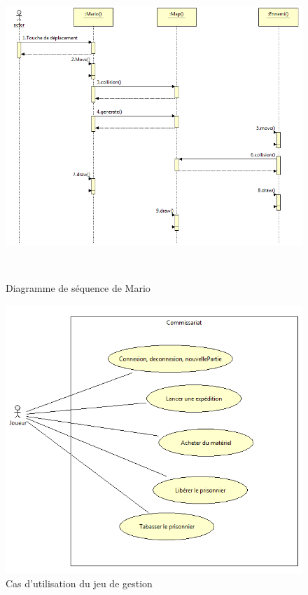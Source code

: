 \begin{figure}[h]
 \centering
 \includegraphics[height=11.5cm]{../umls/UML_images/Mario/Sequence} \hfill
 \caption{Diagramme de séquence de Mario}
\end{figure}


% 
% 
% 
% 
% 

\clearpage
{}

\begin{figure}[h]
 \centering
 \includegraphics[width=\textwidth]{../umls/UML_images/Commissariat/utilisation} \hfill
 \caption{Cas d'utilisation du jeu de gestion}
\end{figure}

